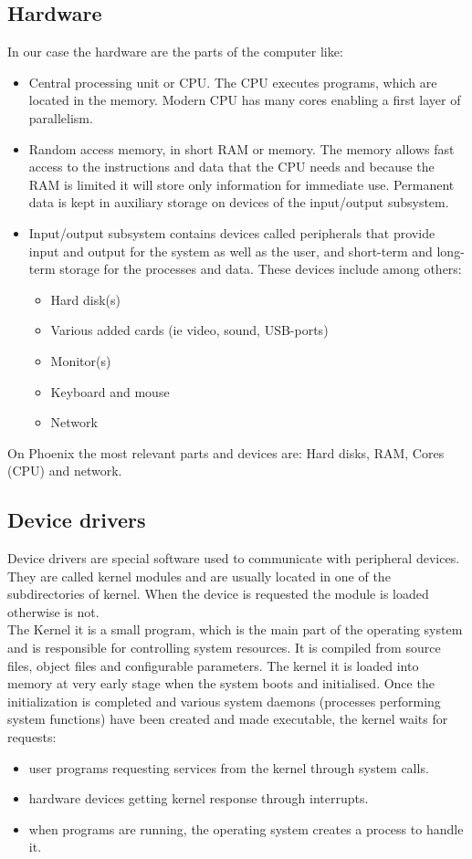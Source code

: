 \subsection{Hardware}
In our case the hardware are the parts of the computer like:
\begin{itemize}
\item Central processing unit or CPU. The CPU executes programs, which are located in the memory. Modern CPU has many cores enabling a first layer of parallelism.
\item Random access memory, in short RAM or memory. 
The memory allows fast access to the instructions and data that the CPU needs and because the RAM is limited it will store only information for immediate use.
Permanent data is kept in auxiliary storage on devices of the input/output subsystem.
\item Input/output subsystem contains devices called peripherals that provide input and output for the system as well as the user, and short-term and long-term storage for the processes and data. 
These devices include among others:
\begin{itemize}
\item Hard disk(s)
\item Various added cards (ie video, sound, USB-ports)
\item Monitor(s)
\item Keyboard and mouse
\item Network
\end{itemize}
\end{itemize}

On Phoenix the most relevant parts and devices are: Hard disks, RAM, Cores (CPU) and network.

\subsection{Device drivers}

Device drivers are special software used to communicate with peripheral devices.
They are called kernel modules and are usually located in one of the subdirectories of kernel.
When the device is requested the module is loaded otherwise is not. \\

The Kernel it is a small program, which is the main part of the operating system and is responsible for controlling system resources.
It is compiled from source files, object files and configurable parameters.
The kernel it is loaded into memory at very early stage when the system boots and initialised. 
Once the initialization is completed and various system daemons (processes performing system functions) have been created and made executable, the kernel waits for requests:
\begin{itemize}
\item user programs requesting services from the kernel through system calls.
\item hardware devices getting kernel response through interrupts.
\item when programs are running, the operating system creates a process to handle it.
\end{itemize} 


